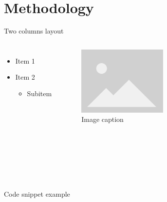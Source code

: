 \documentclass{beamer}
\begin{document}
\section{Methodology}
\begin{frame}{Two columns layout}
    \begin{columns}

        \begin{itemize}
            \item Item 1
            \item Item 2 
            \begin{itemize}
                \item Subitem 
            \end{itemize}
        \end{itemize}
        
        \begin{figure}
            \centering
            \includegraphics[height=0.5\textwidth]{images/placeholder_image.png}
            \caption{Image caption}
            \label{fig:figure1}
        \end{figure}
        
    \end{columns}

    
\end{frame}

\begin{frame}{Code snippet example}
    
\end{frame}
\end{document}
